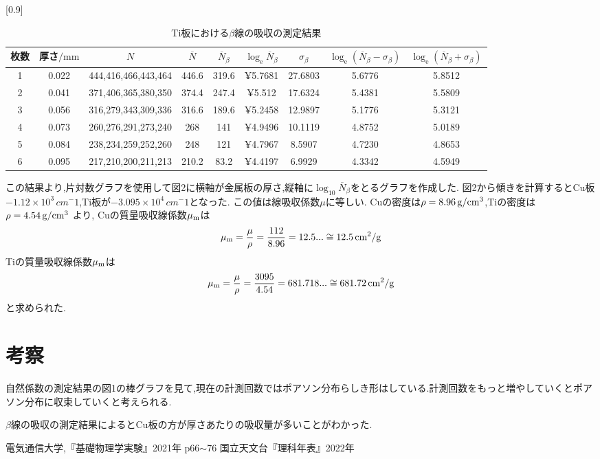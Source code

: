 \documentclass[a4j,10pt]{jarticle}
\begin{document}
  \begin{table}[h]
    \label{Tilkeisoku}
    \begin{center}
    \caption{Ti板における$\beta$線の吸収の測定結果}
    \scalebox{0.6}[0.9]{
      \begin{tabular}{ccccccccc}
      \hline
      枚数 & 厚さ$/\mathrm{mm}$ & $N$ & $\overline{N}$ & $\overline{N}_{\beta}$ & $\log_{\mathrm{e}}\overline{N}_{\beta}$ & $\sigma_{\beta}$ & $\log_{\mathrm{e}}(\overline{N}_{\beta}-\sigma_{\beta})$ & $\log_{\mathrm{e}}(\overline{N}_{\beta}+\sigma_{\beta})$ \\ \hline
      1 & 0.022 & 444,416,466,443,464 & 446.6 & 319.6 & ¥5.7681 & 27.6803 & 5.6776 & 5.8512 \\
      2 & 0.041 & 371,406,365,380,350 & 374.4 & 247.4 & ¥5.512 & 17.6324 & 5.4381 & 5.5809 \\
      3 & 0.056 & 316,279,343,309,336 & 316.6 & 189.6 & ¥5.2458 & 12.9897 & 5.1776 & 5.3121 \\
      4 & 0.073 & 260,276,291,273,240 & 268 & 141 & ¥4.9496 & 10.1119 & 4.8752 & 5.0189 \\
      5 & 0.084 & 238,234,259,252,260 & 248 & 121 & ¥4.7967 & 8.5907 & 4.7230 & 4.8653 \\
      6 & 0.095 & 217,210,200,211,213 & 210.2 & 83.2 & ¥4.4197 & 6.9929 & 4.3342 & 4.5949 \\
      \hline
    \end{tabular}
    }
    \end{center}
  \end{table}
  この結果より,片対数グラフを使用して図2に横軸が金属板の厚さ,縦軸に$\log_{10}\overline{N}_{\beta}$をとるグラフを作成した.
  図2から傾きを計算するとCu板${-1.12×10^3\,cm^-1}$,Ti板が${-3.095×10^4\,cm^-1}$となった.
  この値は線吸収係数$\mu$に等しい.
  Cuの密度は$\rho=8.96\,{\rm g}/{\rm cm}^3$,Tiの密度は$\rho=4.54\,{\rm g}/{\rm cm}^3$ \cite{f}より,
  Cuの質量吸収線係数$\mu_{\rm m}$は
  \begin{equation}
    \mu_{\rm m} = \frac{\mu}{\rho} = \frac{112}{8.96} = 12.5... \cong 12.5\,{\rm cm}^2/{\rm g}
  \end{equation} 
  Tiの質量吸収線係数$\mu_{\rm m}$は
  \begin{equation}
    \mu_{\rm m} = \frac{\mu}{\rho} = \frac{3095}{4.54} = 681.718... \cong 681.72 \,{\rm cm}^2/{\rm g}
  \end{equation}
  と求められた.
  

  \section{考察}
  自然係数の測定結果の図1の棒グラフを見て,現在の計測回数ではポアソン分布らしき形はしている.計測回数をもっと増やしていくとポアソン分布に収束していくと考えられる.
  
  $\beta$線の吸収の測定結果によるとCu板の方が厚さあたりの吸収量が多いことがわかった.
  \begin{thebibliography}{9}
     電気通信大学,『基礎物理学実験』2021年 p66$\sim$76
     国立天文台『理科年表』2022年
    \end{thebibliography}
    
\end{document}
